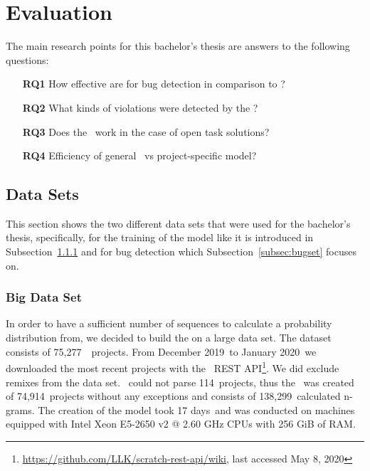 
\newcommand{\numlarge}{75,277}
\newcommand{\monthstart}{December 2019}
\newcommand{\monthend}{January 2020}
\newcommand{\parsingexcp}{114}
\newcommand{\successfullyanalysed}{74,914}
\newcommand{\calculatedngrams}{138,299}
\newcommand{\creationtime}{17 days}

\chapter{Evaluation}\label{chap:evaluation}

The main research points for this bachelor's thesis are answers to the following questions:
\begin{itemize}
\item[\textbf{RQ1}] How effective are  for bug detection in comparison to \litterbox{}?
\item[\textbf{RQ2}] What kinds of violations were detected by the \ngram{}?
\item[\textbf{RQ3}] Does the \ngram\ work in the case of open task solutions?
\item[\textbf{RQ4}] Efficiency of general \ngram\ vs project-specific model?
\end{itemize}


\section{Data Sets}\label{sec:dataset}
This section shows the two different data sets that were used for the bachelor's thesis, specifically, for the training of the model like it is introduced in Subsection~\ref{subsec:trainingset} and for bug detection which Subsection~\ref{subsec:bugset} focuses on.

\subsection{Big Data Set}\label{subsec:trainingset}
In order to have a sufficient number of sequences to calculate a probability distribution from, we decided to build the \ngram{} on a large data set. The dataset consists of \numlarge\ \scratch\ projects. From \monthstart\ to \monthend\ we downloaded the most recent projects with the \scratch\ REST API\footnote{\url{https://github.com/LLK/scratch-rest-api/wiki}, last accessed May 8, 2020}. We did exclude remixes from the data set. \litterbox\ could not parse \parsingexcp\ projects, thus the \ngram\ was created of \successfullyanalysed\ projects without any exceptions and consists of \calculatedngrams\ calculated n-grams. The creation of the model took \creationtime\ and was conducted on machines equipped with Intel Xeon E5-2650 v2 @ 2.60 GHz CPUs with 256 GiB of RAM.

